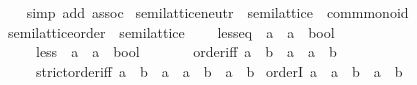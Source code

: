 \begin{isabellebody}
%
\isadelimproof
\ \ %
\endisadelimproof
%
\isatagproof
{}\isamarkupfalse%
\ {\isacharparenleft}{\kern0pt}simp\ add{\isacharcolon}{\kern0pt}\ assoc{\isacharparenright}{\kern0pt}%
\endisatagproof
{\isafoldproof}%
%
\isadelimproof
\isanewline
%
\endisadelimproof
\isanewline
{}\isamarkupfalse%
\isanewline
\isanewline
{}\isamarkupfalse%
\ semilattice{\isacharunderscore}{\kern0pt}neutr\ {\isacharequal}{\kern0pt}\ semilattice\ {\isacharplus}{\kern0pt}\ comm{\isacharunderscore}{\kern0pt}monoid\isanewline
\isanewline
{}\isamarkupfalse%
\ semilattice{\isacharunderscore}{\kern0pt}order\ {\isacharequal}{\kern0pt}\ semilattice\ {\isacharplus}{\kern0pt}\isanewline
\ \ \ less{\isacharunderscore}{\kern0pt}eq\ {\isacharcolon}{\kern0pt}{\isacharcolon}{\kern0pt}\ {\isachardoublequoteopen}{\isacharprime}{\kern0pt}a\ {\isasymRightarrow}\ {\isacharprime}{\kern0pt}a\ {\isasymRightarrow}\ bool{\isachardoublequoteclose}\ \ {\isacharparenleft}{\kern0pt}\ {\isachardoublequoteopen}\isactrlbold {\isasymle}{\isachardoublequoteclose}\ {}{}{\isacharparenright}{\kern0pt}\isanewline
\ \ \ \ \ less\ {\isacharcolon}{\kern0pt}{\isacharcolon}{\kern0pt}\ {\isachardoublequoteopen}{\isacharprime}{\kern0pt}a\ {\isasymRightarrow}\ {\isacharprime}{\kern0pt}a\ {\isasymRightarrow}\ bool{\isachardoublequoteclose}\ \ {\isacharparenleft}{\kern0pt}\ {\isachardoublequoteopen}\isactrlbold {\isacharless}{\kern0pt}{\isachardoublequoteclose}\ {}{}{\isacharparenright}{\kern0pt}\isanewline
\ \ \ order{\isacharunderscore}{\kern0pt}iff{\isacharcolon}{\kern0pt}\ {\isachardoublequoteopen}a\ \isactrlbold {\isasymle}\ b\ {\isasymlongleftrightarrow}\ a\ {\isacharequal}{\kern0pt}\ a\ \isactrlbold {\isacharasterisk}{\kern0pt}\ b{\isachardoublequoteclose}\isanewline
\ \ \ \ \ strict{\isacharunderscore}{\kern0pt}order{\isacharunderscore}{\kern0pt}iff{\isacharcolon}{\kern0pt}\ {\isachardoublequoteopen}a\ \isactrlbold {\isacharless}{\kern0pt}\ b\ {\isasymlongleftrightarrow}\ a\ {\isacharequal}{\kern0pt}\ a\ \isactrlbold {\isacharasterisk}{\kern0pt}\ b\ {\isasymand}\ a\ {\isasymnoteq}\ b{\isachardoublequoteclose}\isanewline
{}\isanewline
\isanewline
{}\isamarkupfalse%
\ orderI{\isacharcolon}{\kern0pt}\ {\isachardoublequoteopen}a\ {\isacharequal}{\kern0pt}\ a\ \isactrlbold {\isacharasterisk}{\kern0pt}\ b\ {\isasymLongrightarrow}\ a\ \isactrlbold {\isasymle}\ b{\isachardoublequoteclose}\isanewline

\end{isabellebody}
